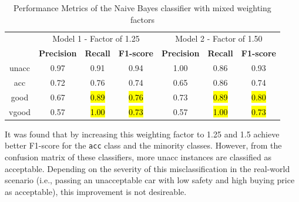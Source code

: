 \documentclass[a4paper]{article}
\begin{document}
\begin{table}[ht]
  \centering
  \caption{Performance Metrics of the Naive Bayes classifier with mixed weighting factors}
  \label{tab:nb_performance_1.25_5_5}
  \begin{tabular}{|c|c|c|c|c|c|c|}

  \hline
  \centering
  \multirow{2}{*}{Class}    & \multicolumn{3}{c|}{Model 1 - Factor of 1.25}                     & \multicolumn{3}{c|}{Model 2 - Factor of 1.50} \\\cline{2-7} 
                            & \textbf{Precision}  & \textbf{Recall}   & \textbf{F1-score}       & \textbf{Precision}  & \textbf{Recall}   & \textbf{F1-score}\\
  \hline
  unacc                     & 0.97                & 0.91              & 0.94                    & 1.00                & 0.86              & 0.93\\
  acc                       & 0.72                & 0.76              & 0.74                    & 0.65                & 0.86              & 0.74\\
  good                      & 0.67                & \hl{0.89}         & \hl{0.76}               & 0.73                & \hl{0.89}         & \hl{0.80}\\
  vgood                     & 0.57                & \hl{1.00}         & \hl{0.73}               & 0.57                & \hl{1.00}         & \hl{0.73}\\
  \hline
  \end{tabular}
\end{table}


It was found that by increasing this weighting factor to 1.25 and 1.5 achieve better F1-score for the \lstinline{acc} class and the minority classes. However, from the confusion matrix of these classifiers, more unacc instances are classified as acceptable. Depending on the severity of this misclassification in the real-world scenario (i.e., passing an unacceptable car with low safety and high buying price as acceptable), this improvement is not desireable.

% 
% 
\end{document}
